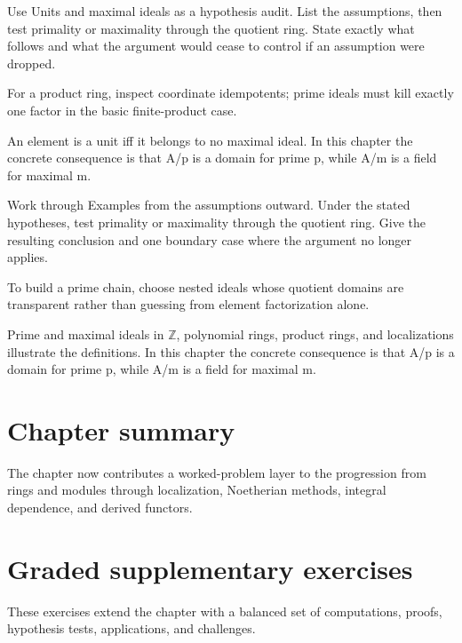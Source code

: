 \begin{exercise}\label{exr:v02-07}
Use Units and maximal ideals as a hypothesis audit. List the assumptions, then test primality or maximality through the quotient ring. State exactly what follows and what the argument would cease to control if an assumption were dropped.
\end{exercise}
\begin{hint}
For a product ring, inspect coordinate idempotents; prime ideals must kill exactly one factor in the basic finite-product case.
\end{hint}
\begin{solution}
An element is a unit iff it belongs to no maximal ideal. In this chapter the concrete consequence is that A/p is a domain for prime p, while A/m is a field for maximal m.
\end{solution}

\begin{exercise}\label{exr:v02-08}
Work through Examples from the assumptions outward. Under the stated hypotheses, test primality or maximality through the quotient ring. Give the resulting conclusion and one boundary case where the argument no longer applies.
\end{exercise}
\begin{hint}
To build a prime chain, choose nested ideals whose quotient domains are transparent rather than guessing from element factorization alone.
\end{hint}
\begin{solution}
Prime and maximal ideals in $\mathbb Z$, polynomial rings, product rings, and localizations illustrate the definitions. In this chapter the concrete consequence is that A/p is a domain for prime p, while A/m is a field for maximal m.
\end{solution}

\section*{Chapter summary}
The chapter now contributes a worked-problem layer to the progression from rings and modules through localization, Noetherian methods, integral dependence, and derived functors.
\section{Graded supplementary exercises}
These exercises extend the chapter with a balanced set of computations, proofs, hypothesis tests, applications, and challenges.

